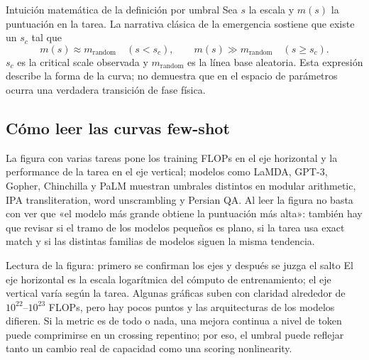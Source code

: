 
\begin{importantbox}{Intuición matemática de la definición por umbral}
Sea $s$ la escala y $m(s)$ la puntuación en la tarea. La narrativa clásica de la emergencia sostiene que existe un $s_c$ tal que
\[
m(s)\approx m_{\text{random}}\quad(s<s_c),\qquad
m(s)\gg m_{\text{random}}\quad(s\ge s_c).
\]
$s_c$ es la critical scale observada y $m_{\text{random}}$ es la línea base aleatoria. Esta expresión describe la forma de la curva; no demuestra que en el espacio de parámetros ocurra una verdadera transición de fase física.
\end{importantbox}


\subsection{Cómo leer las curvas few-shot}

La figura con varias tareas pone los training FLOPs en el eje horizontal y la performance de la tarea en el eje vertical; modelos como LaMDA, GPT-3, Gopher, Chinchilla y PaLM muestran umbrales distintos en modular arithmetic, IPA transliteration, word unscrambling y Persian QA. Al leer la figura no basta con ver que «el modelo más grande obtiene la puntuación más alta»: también hay que revisar si el tramo de los modelos pequeños es plano, si la tarea usa exact match y si las distintas familias de modelos siguen la misma tendencia.


\begin{knowledgebox}{Lectura de la figura: primero se confirman los ejes y después se juzga el salto}
El eje horizontal es la escala logarítmica del cómputo de entrenamiento; el eje vertical varía según la tarea. Algunas gráficas suben con claridad alrededor de $10^{22}$--$10^{23}$ FLOPs, pero hay pocos puntos y las arquitecturas de los modelos difieren. Si la metric es de todo o nada, una mejora continua a nivel de token puede comprimirse en un crossing repentino; por eso, el umbral puede reflejar tanto un cambio real de capacidad como una scoring nonlinearity.
\end{knowledgebox}

